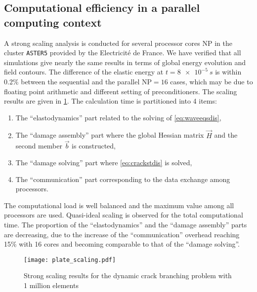 \subsection{Computational efficiency in a parallel computing context}
A strong scaling analysis is conducted for several processor cores $\mathrm{NP}$ in the cluster \texttt{ASTER5} provided by the Electricité de France. We have verified that all simulations give nearly the same results in terms of global energy evolution and field contours. The difference of the elastic energy at $t=\SI{8e-5}{s}$ is within 0.2\% between the sequential and the parallel $\mathrm{NP}=16$ cases, which may be due to floating point arithmetic and different setting of preconditioners. The scaling results are given in \cref{fig:scaling}. The calculation time is partitioned into 4 items:
\begin{enumerate}
\item The ``elastodynamics'' part related to the solving of \eqref{eq:waveeqsdis},
\item The ``damage assembly'' part where the global Hessian matrix $\vec{H}$ and the second member $\vec{b}$ is constructed,
\item The ``damage solving'' part where \eqref{eq:crackstdis} is solved,
\item The ``communication'' part corresponding to the data exchange among processors.
\end{enumerate}
The computational load is well balanced and the maximum value among all processors are used. Quasi-ideal scaling is observed for the total computational time. The proportion of the ``elastodynamics'' and the ``damage assembly'' parts are decreasing, due to the increase of the ``communication'' overhead reaching 15\% with 16 cores and becoming comparable to that of the ``damage solving''.
\begin{figure}[htbp]
\centering
\texttt{[image: plate\_scaling.pdf]}
\caption{Strong scaling results for the dynamic crack branching problem with 1 million elements} \label{fig:scaling}
\end{figure}

